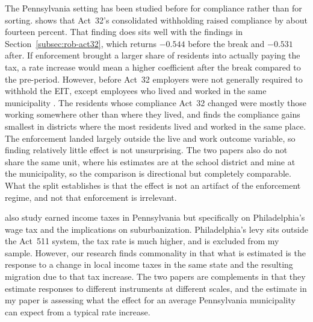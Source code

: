 \documentclass[12pt]{article}
\begin{document}
The Pennsylvania setting has been studied before for compliance rather
than for sorting. \citet{bagchiEffectsIntroducingWithholding2022} shows
that Act~32's consolidated withholding raised compliance by about
fourteen percent. That finding does sits well with the findings in
Section~\ref{subsec:rob-act32}, which returns $-0.544$ before the break and
$-0.531$ after. If enforcement brought a larger share of residents into
actually paying the tax, a rate increase would mean a higher
coefficient after the break compared to the pre-period. However, before Act~32 employers were not
generally required to withhold the EIT, except
employees who lived and worked in the same municipality \citep{bagchiEffectsIntroducingWithholding2022}. The residents whose
compliance Act~32 changed were mostly those working somewhere other than
where they lived, and \citet{bagchiEffectsIntroducingWithholding2022} finds
the compliance gains smallest in districts where the most residents lived and
worked in the same place. The enforcement landed largely
outside the live and work outcome variable, so finding relatively little effect is not unsurprising. The two papers also do not share the same unit, where his
estimates are at the school district and mine at the municipality, so the
comparison is directional but completely comparable. What the split establishes
is that the effect is not an artifact of the enforcement regime, and not
that enforcement is irrelevant.

\citet{livasLocalTaxesSuburbanization2026} also study earned income taxes in Pennsylvania but specifically on Philadelphia's wage tax and the implications on
suburbanization.
Philadelphia's levy sits outside the Act~511 system, the tax rate is much higher, and is excluded from my sample. However, our research finds commonality in that what is estimated is the
response to a change in local income taxes in the same state and the resulting migration due to that tax increase. The two papers are complements in that they estimate responses to
different instruments at different scales, and the estimate in my paper is assessing what the effect for an average Pennsylvania municipality can expect from
a typical rate increase. %
\end{document}
